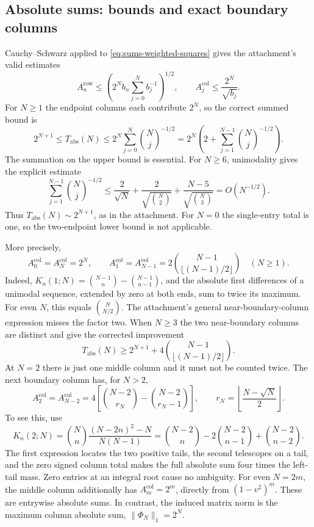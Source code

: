 \subsection{Absolute sums: bounds and exact boundary columns}
Cauchy--Schwarz applied to \eqref{eq:sums-weighted-squares} gives the attachment's valid estimates
\begin{equation}\label{eq:sums-absolute-bounds}
A_n^{\mathrm{row}}\le\left(2^Nb_n\sum_{j=0}^N b_j^{-1}\right)^{1/2},\qquad
A_j^{\mathrm{col}}\le\frac{2^N}{\sqrt{b_j}}.
\end{equation}
For $N\ge1$ the endpoint columns each contribute $2^N$, so the correct summed bound is
\begin{equation}\label{eq:sums-total-absolute-bound}
2^{N+1}\le T_{\mathrm{abs}}(N)\le
2^N\sum_{j=0}^N\binom Nj^{-1/2}
=2^N\left(2+\sum_{j=1}^{N-1}\binom Nj^{-1/2}\right).
\end{equation}
The summation on the upper bound is essential. For $N\ge6$, unimodality gives the explicit estimate
\[
\sum_{j=1}^{N-1}\binom Nj^{-1/2}\le
\frac2{\sqrt N}+\frac2{\sqrt{\binom N2}}
+\frac{N-5}{\sqrt{\binom N3}}=O(N^{-1/2}).
\]
Thus $T_{\mathrm{abs}}(N)\sim2^{N+1}$, as in the attachment. For $N=0$ the single-entry total is one, so the two-endpoint lower bound is not applicable.

More precisely,
\begin{equation}\label{eq:sums-boundary-modulus}
A_0^{\mathrm{col}}=A_N^{\mathrm{col}}=2^N,\qquad
A_1^{\mathrm{col}}=A_{N-1}^{\mathrm{col}}
=2\binom{N-1}{\lfloor(N-1)/2\rfloor}\quad(N\ge1).
\end{equation}
Indeed, $K_n(1;N)=\binom{N-1}n-\binom{N-1}{n-1}$, and the absolute first differences of a unimodal sequence, extended by zero at both ends, sum to twice its maximum. For even $N$, this equals $\binom N{N/2}$. The attachment's general near-boundary-column expression misses the factor two. When $N\ge3$ the two near-boundary columns are distinct and give the corrected improvement
\begin{equation}\label{eq:sums-improved-lower}
T_{\mathrm{abs}}(N)\ge2^{N+1}+4\binom{N-1}{\lfloor(N-1)/2\rfloor}.
\end{equation}
At $N=2$ there is just one middle column and it must not be counted twice.
The next boundary column has, for $N>2$,
\begin{equation}\label{eq:sums-second-boundary}
A_2^{\mathrm{col}}=A_{N-2}^{\mathrm{col}}
=4\left[\binom{N-2}{r_N}-\binom{N-2}{r_N-1}\right],\qquad
r_N=\left\lfloor\frac{N-\sqrt N}{2}\right\rfloor.
\end{equation}
To see this, use
\[
K_n(2;N)=\binom Nn\frac{(N-2n)^2-N}{N(N-1)}
=\binom{N-2}n-2\binom{N-2}{n-1}+\binom{N-2}{n-2}.
\]
The first expression locates the two positive tails, the second telescopes on a tail, and the zero signed column total makes the full absolute sum four times the left-tail mass. Zero entries at an integral root cause no ambiguity.
For even $N=2m$, the middle column additionally has $A_m^{\mathrm{col}}=2^m$, directly from $(1-v^2)^m$.
These are entrywise absolute sums. In contrast, the induced matrix norm is the maximum column absolute sum, $\|\Phi_N\|_1=2^N$.

